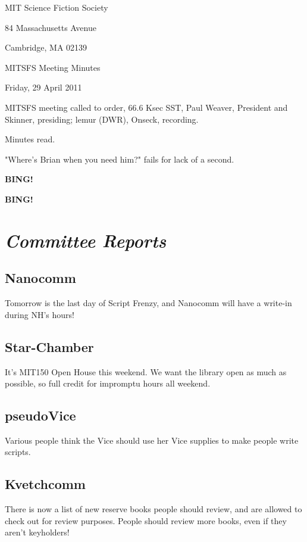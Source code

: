 \documentclass[10pt]{article}
\newcommand{\bing}{{\bf BING!} }
\newcommand{\goto}[1]{\bing \vskip 12pt \section*{{\em{#1}}}}
\newcommand{\skinner}{Paul Weaver, President and Skinner}
\newcommand{\onseck}{lemur (DWR), Onseck}
\newcommand{\meetingdate}{Friday, 29 April 2011}
\begin{document}
\begin{center}

MIT Science Fiction Society

84 Massachusetts Avenue

Cambridge, MA 02139

\vspace{12pt}

MITSFS Meeting Minutes

\meetingdate

\end{center}

\vspace{18pt}

\setlength{\parskip}{6pt}

\noindent
MITSFS meeting called to order, 66.6 Ksec SST,
\skinner, presiding; \onseck, recording.

Minutes read.

"Where's Brian when you need him?" fails for lack of a second.

\bing

\goto{Committee Reports}

\subsection*{Nanocomm}

Tomorrow is the last day of Script Frenzy, and Nanocomm will have a write-in
during NH's hours!


\subsection*{Star-Chamber}

It's MIT150 Open House this weekend.  We want the library open as much as
possible, so full credit for impromptu hours all weekend.


\subsection*{pseudoVice}

Various people think the Vice should use her Vice supplies to make people
write scripts.


\subsection*{Kvetchcomm}

There is now a list of new reserve books people should review, and are 
allowed to check out for review purposes.  People should review more books,
even if they aren't keyholders!
\end{document}
